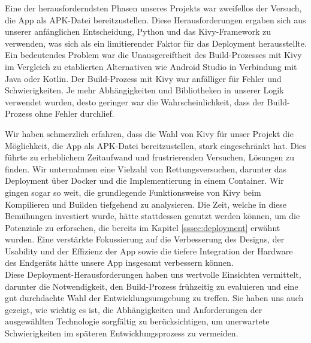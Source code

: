 	Eine der herausforderndsten Phasen unseres Projekts war zweifellos der Versuch, die App als APK-Datei bereitzustellen. Diese Herausforderungen ergaben sich aus unserer anfänglichen Entscheidung, Python und das Kivy-Framework zu verwenden, was sich als ein limitierender Faktor für das Deployment herausstellte. Ein bedeutendes Problem war die Unausgereiftheit des Build-Prozesses mit Kivy im Vergleich zu etablierten Alternativen wie Android Studio in Verbindung mit Java oder Kotlin. Der Build-Prozess mit Kivy war anfälliger für Fehler und Schwierigkeiten. Je mehr Abhängigkeiten und Bibliotheken in unserer Logik verwendet wurden, desto geringer war die Wahrscheinlichkeit, dass der Build-Prozess ohne Fehler durchlief.
	
	Wir haben schmerzlich erfahren, dass die Wahl von Kivy für unser Projekt die Möglichkeit, die App als APK-Datei bereitzustellen, stark eingeschränkt hat. Dies führte zu erheblichem Zeitaufwand und frustrierenden Versuchen, Lösungen zu finden. Wir unternahmen eine Vielzahl von Rettungsversuchen, darunter das Deployment über Docker und die Implementierung in einem Container. Wir gingen sogar so weit, die grundlegende Funktionsweise von Kivy beim Kompilieren und Builden tiefgehend zu analysieren.	Die Zeit, welche in diese Bemühungen investiert wurde, hätte stattdessen genutzt werden können, um die Potenziale zu erforschen, die bereits im Kapitel \ref{sssec:deployment} erwähnt wurden. Eine verstärkte Fokussierung auf die Verbesserung des Designs, der Usability und der Effizienz der App sowie die tiefere Integration der Hardware des Endgeräts hätte unsere App insgesamt verbessern können.
	\\
	Diese Deployment-Herausforderungen haben uns wertvolle Einsichten vermittelt, darunter die Notwendigkeit, den Build-Prozess frühzeitig zu evaluieren und eine gut durchdachte Wahl der Entwicklungsumgebung zu treffen. Sie haben uns auch gezeigt, wie wichtig es ist, die Abhängigkeiten und Anforderungen der ausgewählten Technologie sorgfältig zu berücksichtigen, um unerwartete Schwierigkeiten im späteren Entwicklungsprozess zu vermeiden.